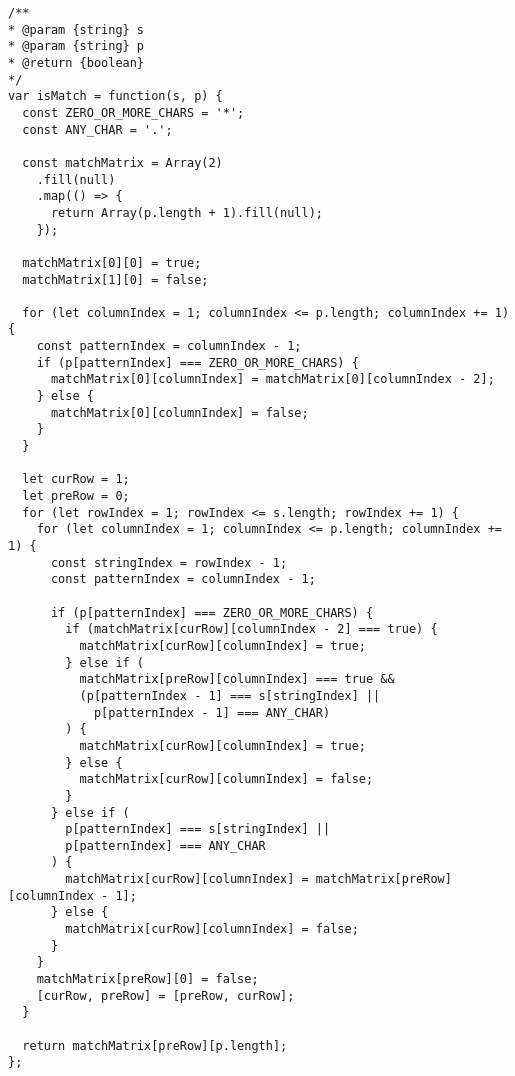 \begin{verbatim}
/**
* @param {string} s
* @param {string} p
* @return {boolean}
*/
var isMatch = function(s, p) {
  const ZERO_OR_MORE_CHARS = '*';
  const ANY_CHAR = '.';

  const matchMatrix = Array(2)
    .fill(null)
    .map(() => {
      return Array(p.length + 1).fill(null);
    });

  matchMatrix[0][0] = true;
  matchMatrix[1][0] = false;

  for (let columnIndex = 1; columnIndex <= p.length; columnIndex += 1) {
    const patternIndex = columnIndex - 1;
    if (p[patternIndex] === ZERO_OR_MORE_CHARS) {
      matchMatrix[0][columnIndex] = matchMatrix[0][columnIndex - 2];
    } else {
      matchMatrix[0][columnIndex] = false;
    }
  }

  let curRow = 1;
  let preRow = 0;
  for (let rowIndex = 1; rowIndex <= s.length; rowIndex += 1) {
    for (let columnIndex = 1; columnIndex <= p.length; columnIndex += 1) {
      const stringIndex = rowIndex - 1;
      const patternIndex = columnIndex - 1;

      if (p[patternIndex] === ZERO_OR_MORE_CHARS) {
        if (matchMatrix[curRow][columnIndex - 2] === true) {
          matchMatrix[curRow][columnIndex] = true;
        } else if (
          matchMatrix[preRow][columnIndex] === true &&
          (p[patternIndex - 1] === s[stringIndex] ||
            p[patternIndex - 1] === ANY_CHAR)
        ) {
          matchMatrix[curRow][columnIndex] = true;
        } else {
          matchMatrix[curRow][columnIndex] = false;
        }
      } else if (
        p[patternIndex] === s[stringIndex] ||
        p[patternIndex] === ANY_CHAR
      ) {
        matchMatrix[curRow][columnIndex] = matchMatrix[preRow][columnIndex - 1];
      } else {
        matchMatrix[curRow][columnIndex] = false;
      }
    }
    matchMatrix[preRow][0] = false;
    [curRow, preRow] = [preRow, curRow];
  }

  return matchMatrix[preRow][p.length];
};
\end{verbatim}

